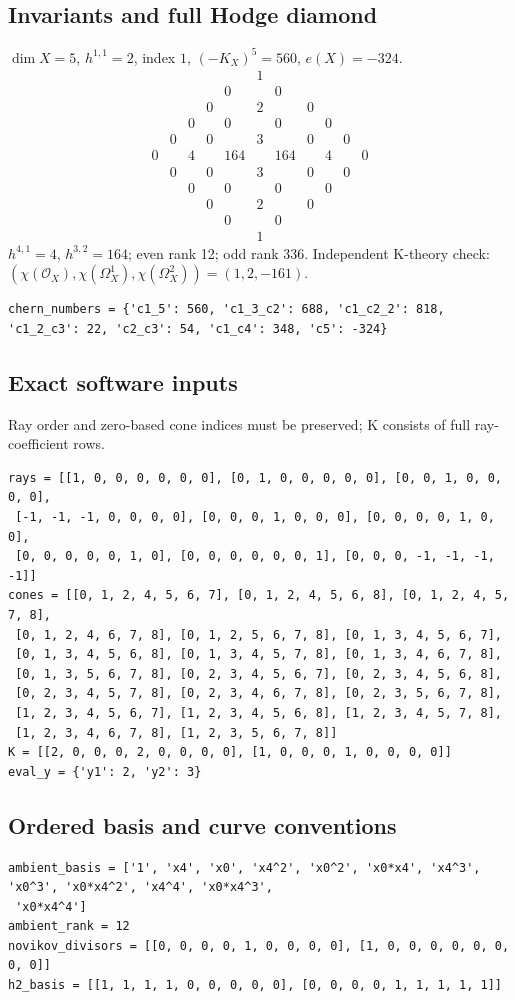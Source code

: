 \documentclass[10pt,a4paper]{article}
\begin{document}
\subsection*{Invariants and full Hodge diamond}
$\dim X=5$, $h^{1,1}=2$, index $1$, $(-K_X)^5=560$, $e(X)=-324$.
\[\begin{array}{ccccccccccc}&&&&&1&&&&&\\&&&&0&&0&&&&\\&&&0&&2&&0&&&\\&&0&&0&&0&&0&&\\&0&&0&&3&&0&&0&\\0&&4&&164&&164&&4&&0\\&0&&0&&3&&0&&0&\\&&0&&0&&0&&0&&\\&&&0&&2&&0&&&\\&&&&0&&0&&&&\\&&&&&1&&&&&\end{array}\]
$h^{4,1}=4$, $h^{3,2}=164$; even rank 12; odd rank 336.
Independent K-theory check: $(\chi(\mathcal O_X),\chi(\Omega_X^1),\chi(\Omega_X^2))=(1, 2, -161)$.
\begin{lstlisting}
chern_numbers = {'c1_5': 560, 'c1_3_c2': 688, 'c1_c2_2': 818, 'c1_2_c3': 22, 'c2_c3': 54, 'c1_c4': 348, 'c5': -324}
\end{lstlisting}
\subsection*{Exact software inputs}
Ray order and zero-based cone indices must be preserved; K consists of full ray-coefficient rows.
\begin{lstlisting}
rays = [[1, 0, 0, 0, 0, 0, 0], [0, 1, 0, 0, 0, 0, 0], [0, 0, 1, 0, 0, 0, 0],
 [-1, -1, -1, 0, 0, 0, 0], [0, 0, 0, 1, 0, 0, 0], [0, 0, 0, 0, 1, 0, 0],
 [0, 0, 0, 0, 0, 1, 0], [0, 0, 0, 0, 0, 0, 1], [0, 0, 0, -1, -1, -1, -1]]
cones = [[0, 1, 2, 4, 5, 6, 7], [0, 1, 2, 4, 5, 6, 8], [0, 1, 2, 4, 5, 7, 8],
 [0, 1, 2, 4, 6, 7, 8], [0, 1, 2, 5, 6, 7, 8], [0, 1, 3, 4, 5, 6, 7],
 [0, 1, 3, 4, 5, 6, 8], [0, 1, 3, 4, 5, 7, 8], [0, 1, 3, 4, 6, 7, 8],
 [0, 1, 3, 5, 6, 7, 8], [0, 2, 3, 4, 5, 6, 7], [0, 2, 3, 4, 5, 6, 8],
 [0, 2, 3, 4, 5, 7, 8], [0, 2, 3, 4, 6, 7, 8], [0, 2, 3, 5, 6, 7, 8],
 [1, 2, 3, 4, 5, 6, 7], [1, 2, 3, 4, 5, 6, 8], [1, 2, 3, 4, 5, 7, 8],
 [1, 2, 3, 4, 6, 7, 8], [1, 2, 3, 5, 6, 7, 8]]
K = [[2, 0, 0, 0, 2, 0, 0, 0, 0], [1, 0, 0, 0, 1, 0, 0, 0, 0]]
eval_y = {'y1': 2, 'y2': 3}
\end{lstlisting}
\subsection*{Ordered basis and curve conventions}
\begin{lstlisting}
ambient_basis = ['1', 'x4', 'x0', 'x4^2', 'x0^2', 'x0*x4', 'x4^3', 'x0^3', 'x0*x4^2', 'x4^4', 'x0*x4^3',
 'x0*x4^4']
ambient_rank = 12
novikov_divisors = [[0, 0, 0, 0, 1, 0, 0, 0, 0], [1, 0, 0, 0, 0, 0, 0, 0, 0]]
h2_basis = [[1, 1, 1, 1, 0, 0, 0, 0, 0], [0, 0, 0, 0, 1, 1, 1, 1, 1]]
\end{lstlisting}
\end{document}
